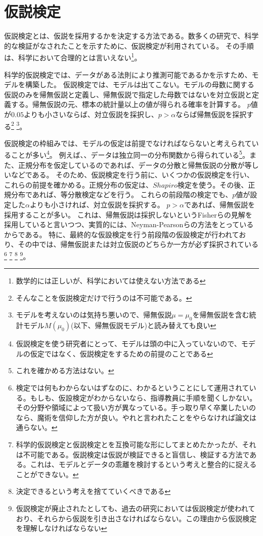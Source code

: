 \chapter{仮説検定}
仮説検定とは、仮説を採用するかを決定する方法である。数多くの研究で、科学的な検証がなされたことを示すために、仮説検定が利用されている。
その手順は、科学において合理的とは言いえない\footnote{数学的には正しいが、科学においては使えない方法である}。


科学的仮説検定では、データがある法則により推測可能であるかを示すため、モデルを構築した。
仮説検定では、モデルは出てこない。モデルの母数に関する仮説のみを帰無仮説と定義し、帰無仮説で指定した母数ではないを対立仮説と定義する。帰無仮説の元、標本の統計量以上の値が得られる確率を計算する。
$p$値が$0.05$よりも小さいならば、対立仮説を採択し、$p>\alpha$ならば帰無仮説を採択する\footnote{そんなことを仮説検定だけで行うのは不可能である。}
\footnote{モデルを考えないのは気持ち悪いので、帰無仮説$\mu=\mu_0$を帰無仮説を含む統計モデル$M(\mu_0)$(以下、帰無仮説モデル)と読み替えても良い}。

仮説検定の枠組みでは、モデルの仮定は前提でなければならないと考えられていることが多い\footnote{仮説検定を使う研究者にとって、モデルは頭の中に入っていないので、モデルの仮定ではなく、仮説検定をするための前提のことである}。
例えば、、データは独立同一の分布関数から得られている\footnote{これを確かめる方法はない。}。また、正規分布を仮定しているのであれば、データの分散と帰無仮説の分散が等しいなどである。
そのため、仮説検定を行う前に、いくつかの仮説検定を行い、これらの前提を確かめる。正規分布の仮定は、$Shapiro$検定を使う。その後、正規分布であれば、等分散検定などを行う。
これらの前段階の検定でも、$p$値が設定した$\alpha$よりも小さければ、対立仮説を採択する。
$p>\alpha$であれば、帰無仮説を採用することが多い。
これは、帰無仮説は採択しないというFisherらの見解を採用していると言いつつ、実質的には、Neyman-Pearsonらの方法をとっているからである。
特に、最終的な仮設検定を行う前段階の仮設検定が行われており、その中では、帰無仮説または対立仮説のどちらか一方が必ず採択されている\footnote{検定では何もわからないはずなのに、わかるということにして運用されている。もしも、仮設検定がわからないなら、指導教員に手順を聞くしかない。その分野や領域によって扱い方が異なっている。手っ取り早く卒業したいのなら、魔術を信仰した方が良い。やれと言われたことをやらなければ論文は通らない。}
\footnote{科学的仮説検定と仮説検定とを互換可能な形にしてまとめたかったが、それは不可能である。仮説検定は仮説が検証できると盲信し、検証する方法である。これは、モデルとデータの乖離を検討するという考えと整合的に捉えることができない。}
\footnote{決定できるという考えを捨てていくべきである}
\footnote{仮説検定が廃止されたとしても、過去の研究においては仮説検定が使われており、それらから仮説を引き出さなければならない。この理由から仮説検定を理解しなければならない}。


